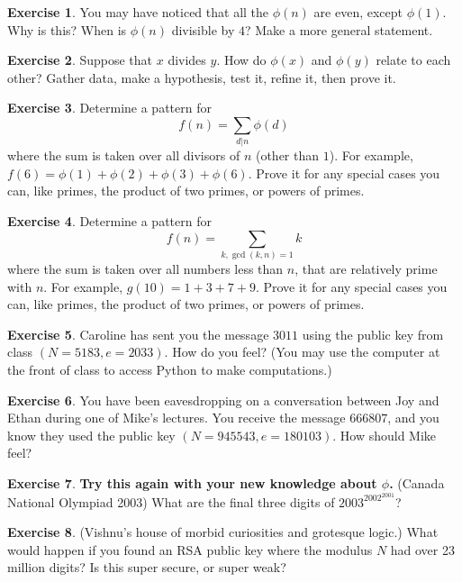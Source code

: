 \documentclass[11pt]{article}
\theoremstyle{definition}
\newtheorem{exercise}{Exercise}
\numberwithin{thm}{section}
\begin{document}
\begin{exercise} You may have noticed that all the $\phi(n)$ are even, except $\phi(1)$. Why is this? When is $\phi(n)$ divisible by $4$? Make a more general statement.
\end{exercise}

\begin{exercise} Suppose that $x$ divides $y$.  How do $\phi(x)$ and $\phi(y)$ relate to each other? Gather data, make a hypothesis, test it, refine it, then prove it.
\end{exercise}

\begin{exercise} Determine a pattern for
\[
	f(n) = \sum_{d | n} \phi(d)
\]
where the sum is taken over all divisors of $n$ (other than $1$). For example, $f(6) = \phi(1) + \phi(2) + \phi(3) + \phi(6)$. Prove it for any special cases you can, like primes, the product of two primes, or powers of primes.
\end{exercise}

\begin{exercise} Determine a pattern for
\[
	f(n) = \sum_{k, \gcd(k,n) = 1} k
\]
where the sum is taken over all numbers less than $n$, that are relatively prime with $n$. For example, $g(10) = 1 + 3 + 7 + 9$. Prove it for any special cases you can, like primes, the product of two primes, or powers of primes.
\end{exercise}

\begin{exercise} Caroline has sent you the message $3011$ using the public key from class $(N=5183, e=2033)$. How do you feel? (You may use the computer at the front of class to access Python to make computations.)
\end{exercise}

\begin{exercise} You have been eavesdropping on a conversation between Joy and Ethan during one of Mike's lectures. You receive the message $666807$, and you know they used the public key $(N=945543, e=180103)$. How should Mike feel?
\end{exercise}

\begin{exercise} \textbf{Try this again with your new knowledge about $\phi$.} (Canada National Olympiad 2003) What are the final three digits of $2003^{2002^{2001}}$?
\end{exercise}

\begin{exercise} (Vishnu's house of morbid curiosities and grotesque logic.) What would happen if you found an RSA public key where the modulus $N$ had over 23 million digits? Is this super secure, or super weak?
\end{exercise}
\end{document}
